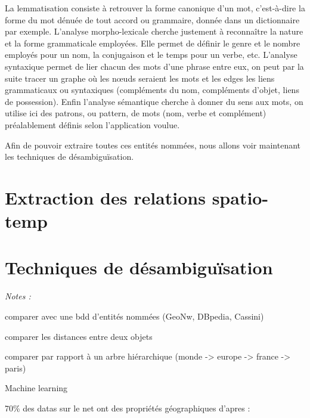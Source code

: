\documentclass[a4paper]{book}
\begin{document}
La lemmatisation consiste à retrouver la forme canonique d'un mot, c'est-à-dire la forme du mot dénuée de tout accord ou grammaire, donnée dans un dictionnaire par exemple. L'analyse morpho-lexicale cherche justement à reconnaître la nature et la forme grammaticale employées. Elle permet de définir le genre et le nombre employés pour un nom, la conjugaison et le temps pour un verbe, etc. L'analyse syntaxique permet de lier chacun des mots d'une phrase entre eux, on peut par la suite tracer un graphe où les nœuds seraient les mots et les edges les liens grammaticaux ou syntaxiques (compléments du nom, compléments d'objet, liens de possession). Enfin l'analyse sémantique cherche à donner du sens aux mots, on utilise ici des patrons, ou pattern, de mots (nom, verbe et complément) préalablement définis selon l'application voulue.








\bigbreak



Afin de pouvoir extraire toutes ces entités nommées, nous allons voir maintenant les techniques de désambiguïsation.
 



\section{Extraction des relations spatio-temp}




\section{Techniques de désambiguïsation}


\textit{Notes : }


comparer avec une bdd d'entités nommées (GeoNw, DBpedia, Cassini)

comparer les distances entre deux objets

comparer par rapport à un arbre hiérarchique (monde -> europe -> france -> paris)










\cite{MARTINEAU2007}

Machine learning



70\% des datas sur le net ont des propriétés géographiques d'apres :
\end{document}
